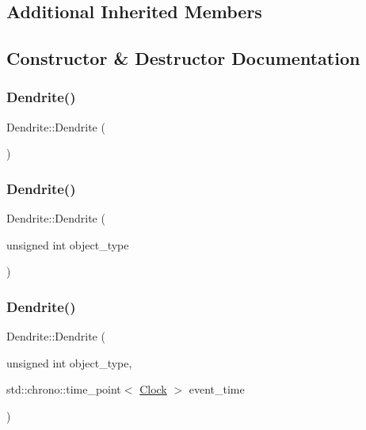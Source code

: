 \subsection*{Additional Inherited Members}


\subsection{Constructor \& Destructor Documentation}
\mbox{\label{classDendrite_a0a35047fcf3dad2f81be348499e32337}} 
\subsubsection{\texorpdfstring{Dendrite()}{Dendrite()}\hspace{0.1cm}{\footnotesize\ttfamily [1/4]}}
{\footnotesize\ttfamily Dendrite\+::\+Dendrite (\begin{DoxyParamCaption}{ }\end{DoxyParamCaption})\hspace{0.3cm}{\ttfamily [inline]}}

\mbox{\label{classDendrite_ae702e9fd351be8dc3a09afa0ed431c3b}} 
\subsubsection{\texorpdfstring{Dendrite()}{Dendrite()}\hspace{0.1cm}{\footnotesize\ttfamily [2/4]}}
{\footnotesize\ttfamily Dendrite\+::\+Dendrite (\begin{DoxyParamCaption}\item[{unsigned int}]{object\+\_\+type }\end{DoxyParamCaption})\hspace{0.3cm}{\ttfamily [inline]}}

\mbox{\label{classDendrite_a10313257362c8f62c8b01a9992ec9ff7}} 
\subsubsection{\texorpdfstring{Dendrite()}{Dendrite()}\hspace{0.1cm}{\footnotesize\ttfamily [3/4]}}
{\footnotesize\ttfamily Dendrite\+::\+Dendrite (\begin{DoxyParamCaption}\item[{unsigned int}]{object\+\_\+type,  }\item[{std\+::chrono\+::time\+\_\+point$<$ \mbox{\hyperlink{universe_8h_a0ef8d951d1ca5ab3cfaf7ab4c7a6fd80}{Clock}} $>$}]{event\+\_\+time }\end{DoxyParamCaption})\hspace{0.3cm}{\ttfamily [inline]}}

